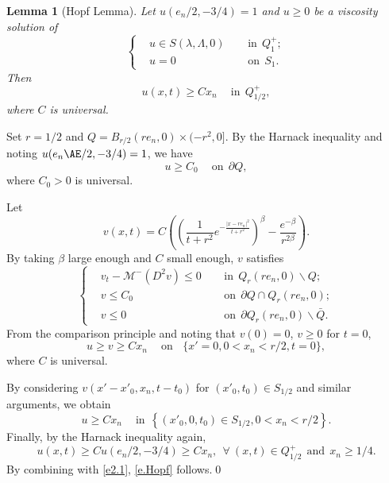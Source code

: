 \documentclass[preprint,12pt]{elsarticle}
\newtheorem{lemma}[theorem]{Lemma}
\theoremstyle{definition}
\theoremstyle{remark}
\numberwithin{equation}{section}
\begin{document}
\begin{lemma}[Hopf Lemma]\label{L3}
  Let $u(e_n/2,-3/4)=1$ and $u\geq 0$ be a viscosity solution of
  \begin{equation}\label{e.S0}
\left\{\begin{aligned}
&u\in S(\lambda,\Lambda,0)&& ~~\mbox{in}~~Q_1^+;\\
&u=0&& ~~\mbox{on}~~S_1.
\end{aligned}\right.
\end{equation}
Then
\begin{equation}\label{e.Hopf}
u(x,t)\geq Cx_n~~~~\mbox{ in}~~Q_{1/2}^+,
\end{equation}
where $C$ is universal.
\end{lemma}
\proof Set $r=1/2$ and $Q=B_{r/2}(re_n,0)\times (-r^2,0]$. By the Harnack inequality \cite[Theorem 4.18]{MR1135923} and noting $u(e_n{\AE}/2,-3/4)=1$, we have
\begin{equation*}
   u\geq C_0~~~~\mbox{ on}~~\partial Q,
\end{equation*}
where $C_0>0$ is universal.

Let
\begin{equation}\label{e1.3}
  v(x,t)=C\left( \left(\frac{1}{t+r^2}e^{-\frac{|x-re_n|^2}{t+r^2}}\right)^{\beta}
-\frac{e^{-\beta}}{r^{2\beta}}\right).
\end{equation}
By taking  $\beta$ large enough and $C$ small enough, $v$ satisfies
\begin{equation}\label{e.Hopf.v}
\left\{\begin{aligned}
&v_t-\mathcal{M}^-(D^2v)\leq 0&& ~~\mbox{in}~~Q_{r}(re_n,0)\backslash Q;\\
&v\leq C_0&& ~~\mbox{on}~~\partial Q\cap Q_{r}(re_n,0);\\
&v\leq 0&& ~~\mbox{on}~~\partial Q_{r}(re_n,0)\backslash \bar{Q}.
\end{aligned}\right.
\end{equation}
From the comparison principle and noting that $v(0)=0$, $v\geq 0$ for $t=0$,
\begin{equation}\label{e1.4}
  u\geq v\geq Cx_n~~~~\mbox{ on}~~~~\{x'=0,0< x_n< r/2, t=0\},
\end{equation}
where $C$ is universal.

By considering $v(x'-x'_0,x_n,t-t_0)$  for $(x'_0,t_0)\in S_{1/2}$ and similar arguments, we obtain
\begin{equation}\label{e2.1}
u\geq Cx_n~~~~\mbox{ in}~~\left\{(x'_0,0,t_0)\in S_{1/2},0<x_n<r/2\right\}.
\end{equation}
Finally, by the Harnack inequality again,
\begin{equation*}
u(x,t)\geq Cu(e_n/2,-3/4)\geq Cx_n,~~\forall ~(x,t)\in Q^+_{1/2}~~\mbox{and}~~x_n\geq 1/4.
\end{equation*}
By combining with \cref{e2.1}, \cref{e.Hopf} follows.\qed~\\
\end{document}

